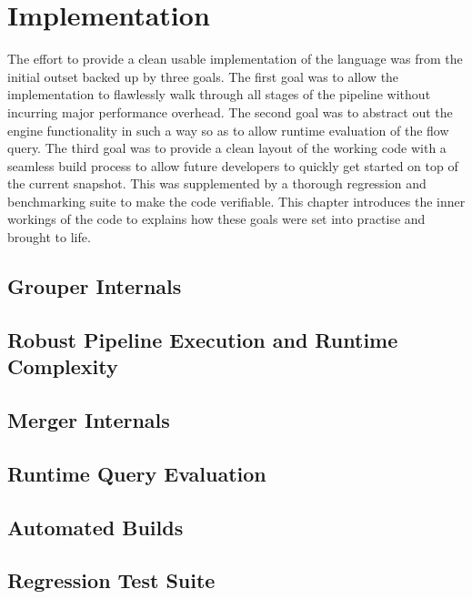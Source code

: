 \chapter{Implementation}\label{ch:implementation}

The effort to provide a clean usable implementation of the language was from
the initial outset backed up by three goals. The first goal was to allow the
implementation to flawlessly walk through all stages of the pipeline without
incurring major performance overhead. The second goal was to abstract out the
engine functionality in such a way so as to allow runtime evaluation of the
flow query. The third goal was to provide a clean layout of the working code
with a seamless build process to allow future developers to quickly get
started on top of the current snapshot. This was supplemented by a thorough
regression and benchmarking suite to make the code verifiable. This chapter
introduces the inner workings of the code to explains how these goals were set
into practise and brought to life.

\section{Grouper Internals}\label{sec:grouper-internals}

\section{Robust Pipeline Execution and Runtime Complexity}\label{sec:pipeline}

\section{Merger Internals}\label{sec:merger-internals}

\section{Runtime Query Evaluation}\label{sec:runtime-query}

\section{Automated Builds}\label{sec:automated-builds}

\section{Regression Test Suite}\label{sec:regression-suite}

